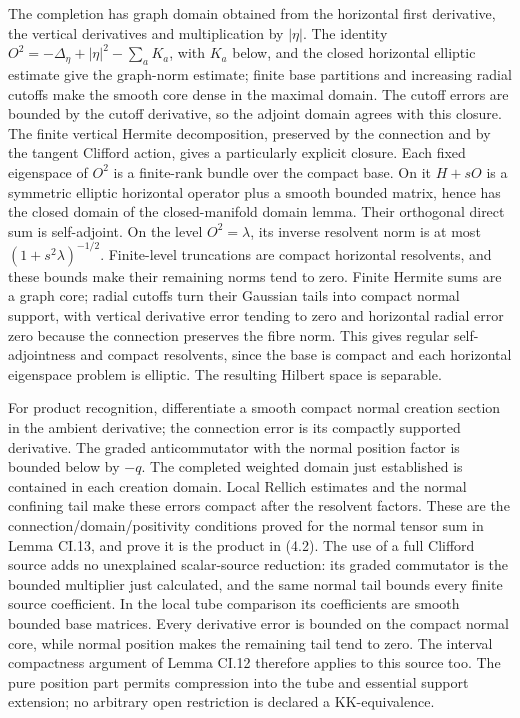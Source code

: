 \documentclass[
  11pt,
]{article}
\begin{document}
The completion has graph domain obtained from the horizontal first
derivative, the vertical derivatives and multiplication by \(|\eta|\).
The identity \(O^2=-\Delta_\eta+|\eta|^2-\sum_a K_a\), with \(K_a\)
below, and the closed horizontal elliptic estimate give the graph-norm
estimate; finite base partitions and increasing radial cutoffs make the
smooth core dense in the maximal domain. The cutoff errors are bounded
by the cutoff derivative, so the adjoint domain agrees with this
closure. The finite vertical Hermite decomposition, preserved by the
connection and by the tangent Clifford action, gives a particularly
explicit closure. Each fixed eigenspace of \(O^2\) is a finite-rank
bundle over the compact base. On it \(H+sO\) is a symmetric elliptic
horizontal operator plus a smooth bounded matrix, hence has the closed
domain of the closed-manifold domain lemma. Their orthogonal direct sum
is self-adjoint. On the level \(O^2=\lambda\), its inverse resolvent
norm is at most \((1+s^2\lambda)^{-1/2}\). Finite-level truncations are
compact horizontal resolvents, and these bounds make their remaining
norms tend to zero. Finite Hermite sums are a graph core; radial cutoffs
turn their Gaussian tails into compact normal support, with vertical
derivative error tending to zero and horizontal radial error zero
because the connection preserves the fibre norm. This gives regular
self-adjointness and compact resolvents, since the base is compact and
each horizontal eigenspace problem is elliptic. The resulting Hilbert
space is separable.

For product recognition, differentiate a smooth compact normal creation
section in the ambient derivative; the connection error is its compactly
supported derivative. The graded anticommutator with the normal position
factor is bounded below by \(-q\). The completed weighted domain just
established is contained in each creation domain. Local Rellich
estimates and the normal confining tail make these errors compact after
the resolvent factors. These are the connection/domain/positivity
conditions proved for the normal tensor sum in Lemma CI.13, and prove it
is the product in (4.2). The use of a full Clifford source adds no
unexplained scalar-source reduction: its graded commutator is the
bounded multiplier just calculated, and the same normal tail bounds
every finite source coefficient. In the local tube comparison its
coefficients are smooth bounded base matrices. Every derivative error is
bounded on the compact normal core, while normal position makes the
remaining tail tend to zero. The interval compactness argument of Lemma
CI.12 therefore applies to this source too. The pure position part
permits compression into the tube and essential support extension; no
arbitrary open restriction is declared a KK-equivalence.
\end{document}
